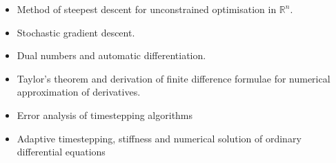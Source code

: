 \documentclass[11pt]{article}
\begin{document}
\begin{multicols}{2}
\begin{itemize}
\item Method of steepest descent for unconstrained optimisation in $\mathbb{R}^n$.
\item Stochastic gradient descent.
\item Dual numbers and automatic differentiation.
\item Taylor's theorem and derivation of finite difference formulae for numerical approximation of derivatives.
\item Error analysis of timestepping algorithms
\item Adaptive timestepping, stiffness and numerical solution of ordinary differential equations
\end{itemize}


\end{multicols}
\end{document}
